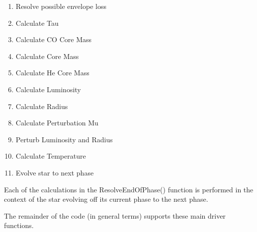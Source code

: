 \medskip
\hfill
\begin{minipage}{\dimexpr\textwidth-2em}
    \begin{enumerate}
        \item  Resolve possible envelope loss

        \item  Calculate Tau

        \item  Calculate CO Core Mass \\
        \item  Calculate Core Mass \\
        \item  Calculate He Core Mass

        \item  Calculate Luminosity \\
        \item  Calculate Radius

        \item  Calculate Perturbation Mu \\
        \item  Perturb Luminosity and Radius

        \item  Calculate Temperature

        \item  Evolve star to next phase
    \end{enumerate}
\end{minipage}

\bigskip
Each of the calculations in the ResolveEndOfPhase() function is performed in the context of the star evolving off its current phase to the next phase.

The remainder of the code (in general terms) supports these main driver functions.
